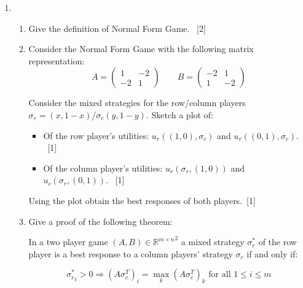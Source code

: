 \documentclass[12pt,a4paper]{article}
\renewcommand{\labelenumi}{\arabic{enumi}} %
\begin{document}
\null \vskip1cm
\begin{enumerate}

\renewcommand\labelenumi{\bfseries\theenumi.}

\item

    \begin{enumerate}
        \item Give the definition of Normal Form Game.
        ~\hfill{[2]}
        \item Consider the Normal Form Game with
            the following matrix representation:
            $$A=
                \begin{pmatrix}
                    1 & -2\\
                    -2 & 1
                \end{pmatrix}
              \qquad
              B=
                \begin{pmatrix}
                    -2 & 1\\
                    1 & -2
                \end{pmatrix}
            $$

            Consider the mixed strategies for the row/column players
            \(\sigma_r=(x,1-x)\)/\(\sigma_c(y,1-y)\). Sketch a plot of:

            \begin{itemize}
                \item Of the row player's utilities: \(u_r((1, 0), \sigma_c)\)
                    and \(u_r((0, 1), \sigma_c)\).
                    ~\hfill{[1]}
                \item Of the column player's utilities: \(u_r(\sigma_r, (1, 0))\)
                    and \(u_c(\sigma_r, (0, 1))\).
                    ~\hfill{[1]}
            \end{itemize}

            Using the plot obtain the best responses of both
            players.~\hfill{[1]}

        \item Give a proof of the following theorem:

              In a two player game $(A,B)\in{\mathbb{R}^{m\times n}}^2$ a mixed
              strategy $\sigma_r^*$  of the row player is a best response to a
              column players' strategy $\sigma_c$ if and only if:

              $${\sigma_r^*}_i > 0 \Rightarrow (A\sigma_c^T)_i =
              \max_{k}(A\sigma_c^T)_k\text{ for all }1\leq i\leq m$$


\end{enumerate}
\end{enumerate}
\end{document}
